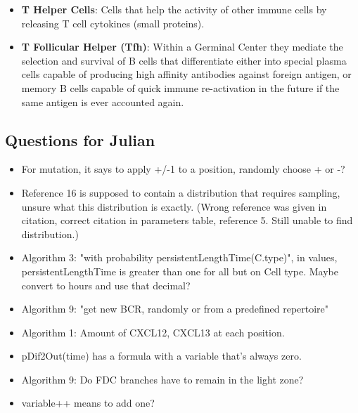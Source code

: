 \documentclass[english]{article}
\begin{document}
\begin{itemize}
\item \textbf{T Helper Cells}: Cells that help the activity of other immune cells by releasing T cell cytokines (small proteins).

\item \textbf{T Follicular Helper (Tfh)}: Within a Germinal Center they mediate the selection and survival of B cells that differentiate either into special plasma cells capable of producing high affinity antibodies against foreign antigen, or memory B cells capable of quick immune re-activation in the future if the same antigen is ever accounted again. 


\end{itemize}

\subsection{Questions for Julian}
\begin{itemize}

\item For mutation, it says to apply +/-1 to a position, randomly choose + or -?

\item Reference 16 is supposed to contain a distribution that requires sampling, unsure what this distribution is exactly. (Wrong reference was given in citation, correct citation in parameters table, reference 5. Still unable to find distribution.)

\item Algorithm 3: "with probability persistentLengthTime(C.type)", in values, persistentLengthTime is greater than one for all but on Cell type. Maybe convert to hours and use that decimal? 

\item Algorithm 9: "get new BCR, randomly or from a predefined repertoire"

\item Algorithm 1: Amount of CXCL12, CXCL13 at each position. 

\item pDif2Out(time) has a formula with a variable that's always zero. 

\item Algorithm 9: Do FDC branches have to remain in the light zone?

\item variable++ means to add one?

\end{itemize}
\end{document}
